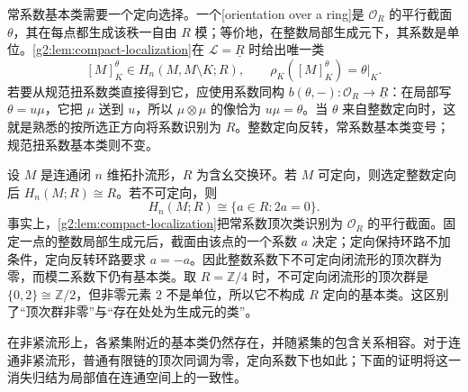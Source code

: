 常系数基本类需要一个定向选择。一个[orientation over a ring]是 \(\mathcal O_R\) 的平行截面 \(\theta\)，其在每点都生成该秩一自由 \(R\) 模；等价地，在整数局部生成元下，其系数是单位。\cref{g2:lem:compact-localization}在 \(\mathcal L=\underline R\) 时给出唯一类
\[
	[M]^{\theta}_K\in H_n(M,M\setminus K;R),\qquad
	\rho_K([M]^{\theta}_K)=\theta|_K.
\]
若要从规范扭系数类直接得到它，应使用系数同构 \(b(\theta,-):\mathcal O_R\to\underline R\)：在局部写 \(\theta=u\mu\)，它把 \(\mu\) 送到 \(u\)，所以 \(\mu\otimes\mu\) 的像恰为 \(u\mu=\theta\)。当 \(\theta\) 来自整数定向时，这就是熟悉的按所选正方向将系数识别为 \(R\)。整数定向反转，常系数基本类变号；规范扭系数基本类则不变。

\begin{example}\label{g2:exm:closed-manifold-top-homology}
	设 \(M\) 是连通闭 \(n\) 维拓扑流形，\(R\) 为含幺交换环。若 \(M\) 可定向，则选定整数定向后 \(H_n(M;R)\cong R\)。若不可定向，则
	\[
		H_n(M;R)\cong\{a\in R:2a=0\}.
	\]
	事实上，\cref{g2:lem:compact-localization}把常系数顶次类识别为 \(\mathcal O_R\) 的平行截面。固定一点的整数局部生成元后，截面由该点的一个系数 \(a\) 决定；定向保持环路不加条件，定向反转环路要求 \(a=-a\)。因此整数系数下不可定向闭流形的顶次群为零，而模二系数下仍有基本类。取 \(R=\mathbb Z/4\) 时，不可定向闭流形的顶次群是 \(\{0,2\}\cong\mathbb Z/2\)，但非零元素 \(2\) 不是单位，所以它不构成 \(R\) 定向的基本类。这区别了“顶次群非零”与“存在处处为生成元的类”。
\end{example}

在非紧流形上，各紧集附近的基本类仍然存在，并随紧集的包含关系相容。对于连通非紧流形，普通有限链的顶次同调为零，定向系数下也如此；下面的证明将这一消失归结为局部值在连通空间上的一致性。


